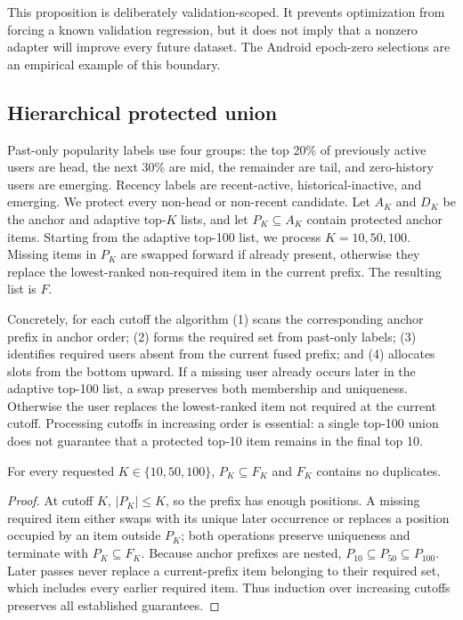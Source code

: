 \documentclass[sigconf,anonymous,review]{acmart}
\begin{document}
This proposition is deliberately validation-scoped. It prevents optimization from forcing a known validation regression, but it does not imply that a nonzero adapter will improve every future dataset. The Android epoch-zero selections are an empirical example of this boundary.

\subsection{Hierarchical protected union}
Past-only popularity labels use four groups: the top 20\% of previously active users are head, the next 30\% are mid, the remainder are tail, and zero-history users are emerging. Recency labels are recent-active, historical-inactive, and emerging. We protect every non-head or non-recent candidate. Let $A_K$ and $D_K$ be the anchor and adaptive top-$K$ lists, and let $P_K\subseteq A_K$ contain protected anchor items. Starting from the adaptive top-100 list, we process $K=10,50,100$. Missing items in $P_K$ are swapped forward if already present, otherwise they replace the lowest-ranked non-required item in the current prefix. The resulting list is $F$.

Concretely, for each cutoff the algorithm (1) scans the corresponding anchor prefix in anchor order; (2) forms the required set from past-only labels; (3) identifies required users absent from the current fused prefix; and (4) allocates slots from the bottom upward. If a missing user already occurs later in the adaptive top-100 list, a swap preserves both membership and uniqueness. Otherwise the user replaces the lowest-ranked item not required at the current cutoff. Processing cutoffs in increasing order is essential: a single top-100 union does not guarantee that a protected top-10 item remains in the final top 10.

\begin{proposition}
For every requested $K\in\{10,50,100\}$, $P_K\subseteq F_K$ and $F_K$ contains no duplicates.
\end{proposition}
\begin{proof}
At cutoff $K$, $|P_K|\le K$, so the prefix has enough positions. A missing required item either swaps with its unique later occurrence or replaces a position occupied by an item outside $P_K$; both operations preserve uniqueness and terminate with $P_K\subseteq F_K$. Because anchor prefixes are nested, $P_{10}\subseteq P_{50}\subseteq P_{100}$. Later passes never replace a current-prefix item belonging to their required set, which includes every earlier required item. Thus induction over increasing cutoffs preserves all established guarantees.
\end{proof}
\end{document}
